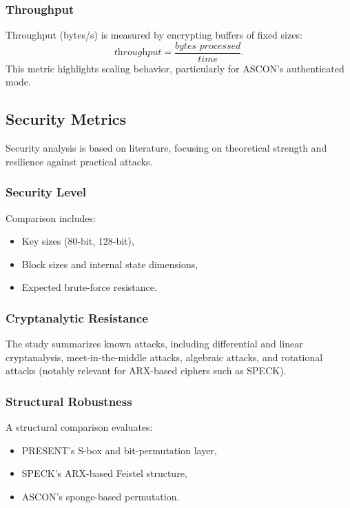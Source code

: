 \documentclass[12pt]{report}
\begin{document}
\subsubsection*{Throughput}

Throughput (bytes/s) is measured by encrypting buffers of fixed sizes:
\[
    \textit{throughput} = \frac{\textit{bytes processed}}{\textit{time}}.
\]
This metric highlights scaling behavior, particularly for ASCON’s authenticated mode.

\subsection{Security Metrics}

Security analysis is based on literature, focusing on theoretical strength and resilience
against practical attacks.

\subsubsection*{Security Level}

Comparison includes:
\begin{itemize}
    \item Key sizes (80-bit, 128-bit),
    \item Block sizes and internal state dimensions,
    \item Expected brute-force resistance.
\end{itemize}

\subsubsection*{Cryptanalytic Resistance}

The study summarizes known attacks, including differential and linear cryptanalysis,
meet-in-the-middle attacks, algebraic attacks, and rotational attacks (notably relevant
for ARX-based ciphers such as SPECK).

\subsubsection*{Structural Robustness}

A structural comparison evaluates:
\begin{itemize}
    \item PRESENT’s S-box and bit-permutation layer,
    \item SPECK’s ARX-based Feistel structure,
    \item ASCON’s sponge-based permutation.
\end{itemize}
\end{document}

